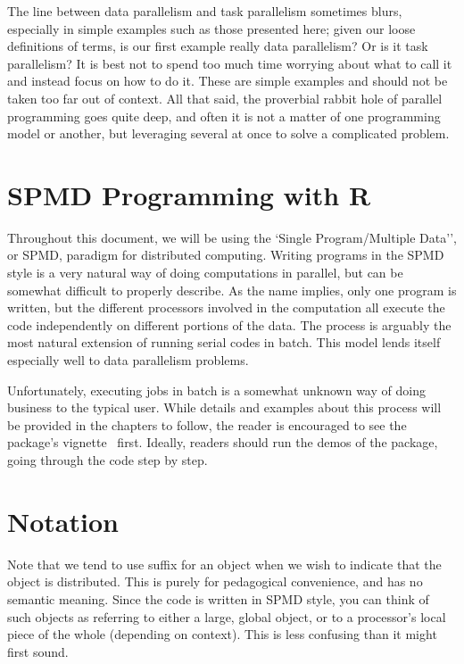 The line between data parallelism and task parallelism sometimes blurs, especially in simple examples such as those presented here; given our loose definitions of terms, is our first example really data parallelism?  Or is it task parallelism?  It is best not to spend too much time worrying about what to call it and instead focus on how to do it.  These are simple examples and should not be taken too far out of context.  All that said, the proverbial rabbit hole of parallel programming goes quite deep, and often it is not a matter of one programming model or another, but leveraging several at once to solve a complicated problem.





\section{SPMD Programming with R}

Throughout this document, we will be using the
`Single Program/Multiple Data'', or SPMD, paradigm for distributed computing.  Writing programs in the SPMD style is a very natural way of doing computations in parallel, but can be somewhat difficult to properly describe.  As the name implies, only one program is written, but the different processors involved in the computation all execute the code independently on different portions of the data.  The process is arguably the most natural extension of running serial codes in batch.  This model lends itself especially well to data parallelism problems.

Unfortunately, executing jobs in batch is a somewhat unknown way of doing business to the typical  user.  While details and examples about this process will be provided in the chapters to follow, the reader is encouraged to see the  package's vignette~\citep{Chen2012pbdMPIvignette} first.  Ideally, readers should run the demos of the  package,
going through the code step by step.




\section{Notation}
\label{sec:notation}

Note that we tend to use suffix
 for an object when we wish to indicate that the object is distributed.  This is purely for pedagogical convenience, and has no semantic meaning.  Since the code is written in SPMD style, you can think of such objects as referring to either a large, global object, or to a processor's local piece of the whole (depending on context).  This is less confusing than it might first sound.

